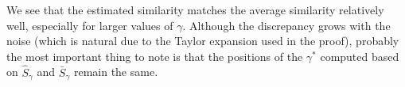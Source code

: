 We see that the estimated similarity matches the average similarity relatively
well, especially for larger values of $\gamma$. Although the discrepancy grows
with the noise (which is natural due to the Taylor expansion used in the proof),
probably the most important thing to note is that the positions of the $\gamma^*$
computed based on $\hat S_\gamma$ and $\bar S_\gamma$ remain the same.




